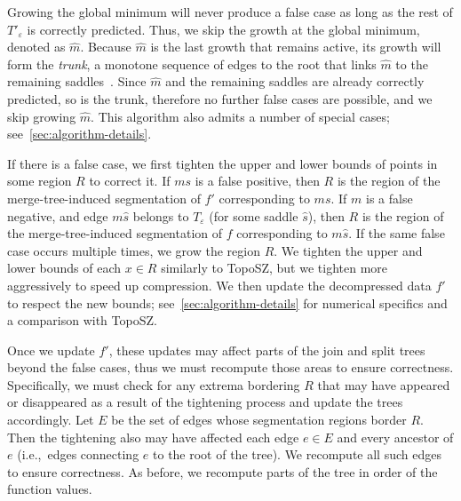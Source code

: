 Growing the global minimum will never produce a false case as long as the rest of $T'_\varepsilon$ is correctly predicted. Thus, we skip the growth at the global minimum, denoted as $\hat{m}$. 
Because $\hat{m}$ is the last growth that remains active, its growth will form the \textit{trunk}, a monotone sequence of edges to the root that links $\hat{m}$ to the remaining saddles~\cite{gueunet2017task}. Since $\hat{m}$ and the remaining saddles are already correctly predicted, so is the trunk, therefore no further false cases are possible, and we skip growing $\hat{m}$. 
This algorithm also admits a number of special cases; see~\cref{sec:algorithm-details}.

If there is a false case, we first tighten the upper and lower bounds of points in some region $R$ to correct it. If $ms$ is a false positive, then $R$ is the region of the merge-tree-induced segmentation of $f'$ corresponding to $ms$. If $m$ is a false negative, and edge $m\hat{s}$ belongs to $T_\varepsilon$ (for some saddle $\hat{s}$), then $R$ is the region of the merge-tree-induced segmentation of $f$ corresponding to $m\hat{s}$. If the same false case occurs multiple times, we grow the region $R$. We tighten the upper and lower bounds of each $x \in R$ similarly to TopoSZ, but we tighten more aggressively to speed up compression. 
We then update the decompressed data $f'$ to respect the new bounds; see~\cref{sec:algorithm-details} for numerical specifics and a comparison with TopoSZ.

Once we update $f'$, these updates may affect parts of the join and split trees beyond the false cases, thus we must recompute those areas to ensure correctness. Specifically, we must check for any extrema bordering $R$ that may have appeared or disappeared as a result of the tightening process and update the trees accordingly. Let $E$ be the set of edges whose segmentation regions border $R$. Then the tightening also may have affected each edge $e \in E$ and every ancestor of $e$ (i.e.,~edges
connecting $e$ to the root of the tree). We recompute all such edges to ensure correctness. As before, we recompute parts of the tree in order of the function values. 

